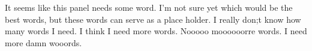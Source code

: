 \documentclass[a0paper,portrait]{baposter}
\begin{document}
\begin{poster}
{\begin{minipage}[h!]{0.49\textwidth}
        \end{minipage}
	It seems like this panel needs some word. I'm not sure yet which would be the best words, 
	but these words can serve as a place holder. I really don;t know how many words I need. I 
	think I need more words. Nooooo moooooorre words. I need more damn wooords.
}

%

%
%


\end{poster}
\end{document}
